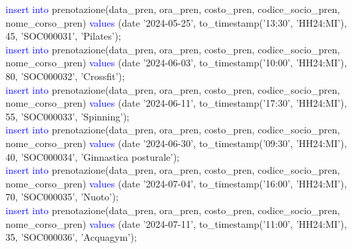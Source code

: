 \documentclass{article}
\begin{document}
\begin{flushleft}
{        \vspace{2mm}
        \hspace*{0.5em}\textcolor{blue}{insert into} prenotazione(data\_pren, ora\_pren, costo\_pren, codice\_socio\_pren, \hspace*{0.5em}nome\_corso\_pren) \textcolor{blue}{values} (date '2024-05-25', to\_timestamp('13:30', 'HH24:MI'), 45, \hspace*{0.5em}'SOC000031', 'Pilates'); \\
        \vspace{2mm}
        \hspace*{0.5em}\textcolor{blue}{insert into} prenotazione(data\_pren, ora\_pren, costo\_pren, codice\_socio\_pren, \hspace*{0.5em}nome\_corso\_pren) \textcolor{blue}{values} (date '2024-06-03', to\_timestamp('10:00', 'HH24:MI'), 80, \hspace*{0.5em}'SOC000032', 'Crossfit'); \\
        \vspace{2mm}
        \hspace*{0.5em}\textcolor{blue}{insert into} prenotazione(data\_pren, ora\_pren, costo\_pren, codice\_socio\_pren, \hspace*{0.5em}nome\_corso\_pren) \textcolor{blue}{values} (date '2024-06-11', to\_timestamp('17:30', 'HH24:MI'), 55, \hspace*{0.5em}'SOC000033', 'Spinning'); \\
        \vspace{2mm}
        \hspace*{0.5em}\textcolor{blue}{insert into} prenotazione(data\_pren, ora\_pren, costo\_pren, codice\_socio\_pren, \hspace*{0.5em}nome\_corso\_pren) \textcolor{blue}{values} (date '2024-06-30', to\_timestamp('09:30', 'HH24:MI'), 40, \hspace*{0.5em}'SOC000034', 'Ginnastica posturale'); \\
        \vspace{2mm}
        \hspace*{0.5em}\textcolor{blue}{insert into} prenotazione(data\_pren, ora\_pren, costo\_pren, codice\_socio\_pren, \hspace*{0.5em}nome\_corso\_pren) \textcolor{blue}{values} (date '2024-07-04', to\_timestamp('16:00', 'HH24:MI'), 70, \hspace*{0.5em}'SOC000035', 'Nuoto'); \\
        \vspace{2mm}
        \hspace*{0.5em}\textcolor{blue}{insert into} prenotazione(data\_pren, ora\_pren, costo\_pren, codice\_socio\_pren, \hspace*{0.5em}nome\_corso\_pren) \textcolor{blue}{values} (date '2024-07-11', to\_timestamp('11:00', 'HH24:MI'), 35, \hspace*{0.5em}'SOC000036', 'Acquagym'); \\
}
\end{flushleft}
\end{document}
